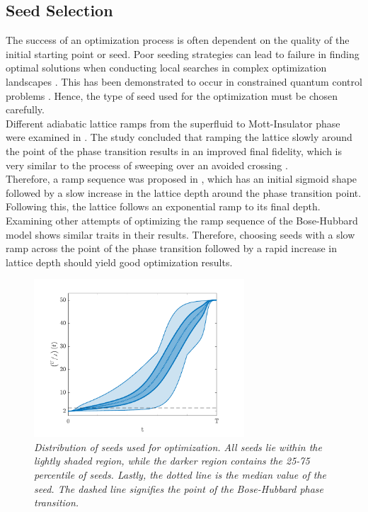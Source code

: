 \subsection{Seed Selection}
The success of an optimization process is often dependent on the quality of the initial starting point or seed. Poor seeding strategies can lead to failure in finding optimal solutions when conducting local searches in complex optimization landscapes \cite{Sorensen2016}. This has been demonstrated to occur in constrained quantum control problems \cite{Zhdanov2015}. Hence, the type of seed used for the optimization must be chosen carefully.\\ 
Different adiabatic lattice ramps from the superfluid to Mott-Insulator phase were examined in \cite{Zakrzewski2009}. The study concluded that ramping the lattice slowly around the point of the phase transition results in an improved final fidelity, which is very similar to the process of sweeping over an avoided crossing \cite{manybodyBloch}.\\
Therefore, a ramp sequence was proposed in \cite{Zakrzewski2009}, which has an initial sigmoid shape followed by a slow increase in the lattice depth around the phase transition point. Following this, the lattice follows an exponential ramp to its final depth. Examining other attempts of optimizing the ramp sequence of the Bose-Hubbard model \cite{Doria2011,FrankBloch} shows similar traits in their results. Therefore, choosing seeds with a slow ramp across the point of the phase transition followed by a rapid increase in lattice depth should yield good optimization results.
\begin{figure}[h!]
    \centering
    \includegraphics[width=0.7\textwidth]{Figures/LinSigSeed.pdf}
    \caption{\textit{Distribution of seeds used for optimization. All seeds lie within the lightly shaded region, while the darker region contains the 25-75 percentile of seeds. Lastly, the dotted line is the median value of the seed. The dashed line signifies the point of the Bose-Hubbard phase transition.}}
    \label{fig:LinSigSeed}
\end{figure}
